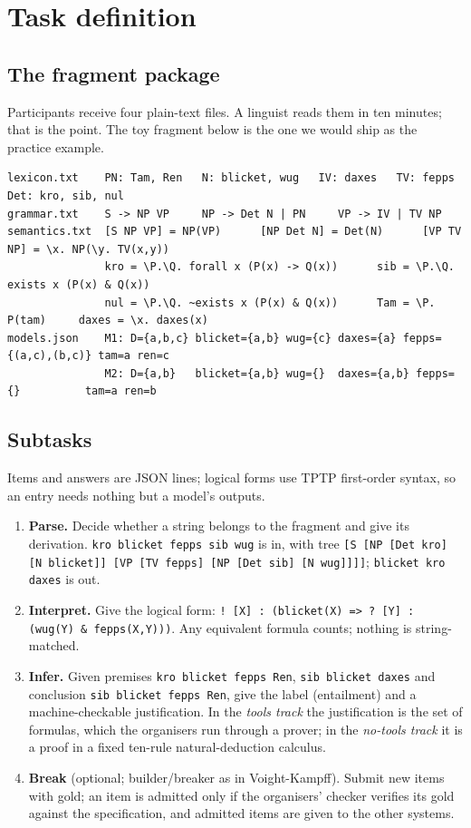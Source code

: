 \documentclass[10pt,a4paper]{article}
\begin{document}
\section{Task definition}
\subsection{The fragment package}
Participants receive four plain-text files. A linguist reads them in ten minutes; that is the point. The toy fragment below is the one we would ship as the practice example.

\begin{lstlisting}
lexicon.txt    PN: Tam, Ren   N: blicket, wug   IV: daxes   TV: fepps   Det: kro, sib, nul
grammar.txt    S -> NP VP     NP -> Det N | PN     VP -> IV | TV NP
semantics.txt  [S NP VP] = NP(VP)      [NP Det N] = Det(N)      [VP TV NP] = \x. NP(\y. TV(x,y))
               kro = \P.\Q. forall x (P(x) -> Q(x))      sib = \P.\Q. exists x (P(x) & Q(x))
               nul = \P.\Q. ~exists x (P(x) & Q(x))      Tam = \P. P(tam)     daxes = \x. daxes(x)
models.json    M1: D={a,b,c} blicket={a,b} wug={c} daxes={a} fepps={(a,c),(b,c)} tam=a ren=c
               M2: D={a,b}   blicket={a,b} wug={}  daxes={a,b} fepps={}          tam=a ren=b
\end{lstlisting}

\subsection{Subtasks}
Items and answers are JSON lines; logical forms use TPTP first-order syntax, so an entry needs nothing but a model's outputs.
\begin{enumerate}
\item \textbf{Parse.} Decide whether a string belongs to the fragment and give its derivation. \texttt{kro blicket fepps sib wug} is in, with tree \texttt{[S [NP [Det kro] [N blicket]] [VP [TV fepps] [NP [Det sib] [N wug]]]]}; \texttt{blicket kro daxes} is out.
\item \textbf{Interpret.} Give the logical form: \texttt{!\,[X]\,:\,(blicket(X) => ?\,[Y]\,:\,(wug(Y) \& fepps(X,Y)))}. Any equivalent formula counts; nothing is string-matched.
\item \textbf{Infer.} Given premises \texttt{kro blicket fepps Ren}, \texttt{sib blicket daxes} and conclusion \texttt{sib blicket fepps Ren}, give the label (entailment) and a machine-checkable justification. In the \emph{tools track} the justification is the set of formulas, which the organisers run through a prover; in the \emph{no-tools track} it is a proof in a fixed ten-rule natural-deduction calculus.
\item \textbf{Break} (optional; builder/breaker as in Voight-Kampff). Submit new items with gold; an item is admitted only if the organisers' checker verifies its gold against the specification, and admitted items are given to the other systems.
\end{enumerate}
\end{document}
